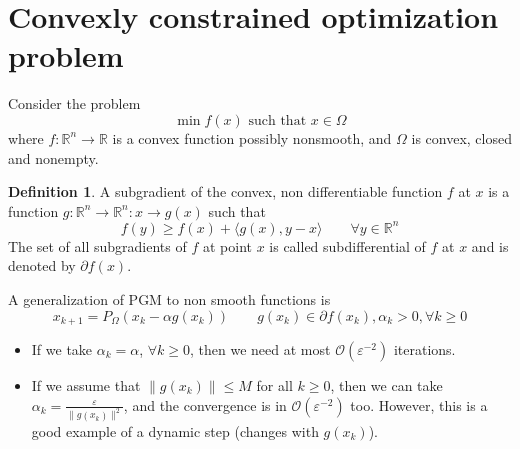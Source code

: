 \documentclass[12pt, openany]{report}
\newcommand{\R}{\mathbb{R}}
\theoremstyle{definition}
\newtheorem{definition}[thm]{Definition}
\begin{document}
\section{Convexly constrained optimization problem}
Consider the problem 
\begin{equation}
    \min f(x) \text{   such that   }x\in \Omega
\end{equation}
where \(f:\R^n\rightarrow \R\) is a convex function possibly nonsmooth, and \(\Omega\) is convex, closed and nonempty. 
\begin{definition}
    A subgradient of the convex, non differentiable function \(f\) at \(x\) is a function \(g:\R^n\rightarrow \R^n :x\rightarrow g(x)\) such that 
    \begin{equation}
        f(y) \ge f(x)+\langle g(x),y-x\rangle \qquad \forall y\in \R^n
    \end{equation}
    The set of all subgradients of \(f\) at point \(x\) is called subdifferential of \(f\) at \(x\) and is denoted by \(\partial f(x)\). 
\end{definition}
A generalization of PGM to non smooth functions is 
\begin{equation}
    x_{k+1} = P_\Omega (x_k-\alpha g(x_k)) \qquad g(x_k)\in \partial f(x_k),\alpha_k>0,\forall k\ge 0
\end{equation}
\begin{itemize}
    \item If we take \(\alpha_k=\alpha \), \(\forall k\ge 0\), then we need at most \(\mathcal{O}(\varepsilon^{-2})\) iterations. 
    \item If we assume that \(\lVert g(x_k)\rVert \le M\) for all \(k\ge 0\), then we can take \(\alpha_k = \frac{\varepsilon}{\lVert g(x_k)\rVert^2}\), and the convergence is in \(\mathcal{O}(\varepsilon^{-2})\) too. However, this is a good example of a dynamic step (changes with \(g(x_k)\)). 
\end{itemize}
\end{document}
